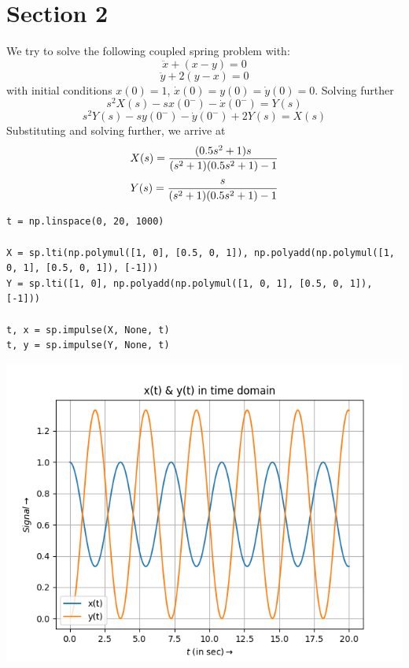 \documentclass[12pt, a4paper]{report}
\begin{document}
\section*{Section 2}
We try to solve the following coupled spring problem with:
\begin{equation*}
\ddot{x} + (x-y) = 0
\end{equation*}
\begin{equation*}
\ddot{y} + 2(y-x) = 0
\end{equation*}
with initial conditions $x(0) = 1$, $\dot{x}(0) = y(0) = \dot{y}(0) = 0$. Solving further 
\begin{equation*}
s^2X(s) -sx(0^-) - \dot{x}(0^-) = Y(s)
\end{equation*}
\begin{equation*}
s^2Y(s) -sy(0^-) - \dot{y}(0^-) + 2Y(s)= X(s)
\end{equation*}
Substituting and solving further, we arrive at
\begin{equation*}
X(s) = \frac{(0.5s^2+1)s}{(s^2 + 1)(0.5s^2 + 1) - 1}\\
\end{equation*}
\begin{equation*}
Y(s) = \frac{s}{(s^2 + 1)(0.5s^2 + 1) - 1}\\
\end{equation*}

\begin{verbatim}
t = np.linspace(0, 20, 1000)

X = sp.lti(np.polymul([1, 0], [0.5, 0, 1]), np.polyadd(np.polymul([1, 0, 1], [0.5, 0, 1]), [-1]))
Y = sp.lti([1, 0], np.polyadd(np.polymul([1, 0, 1], [0.5, 0, 1]), [-1]))

t, x = sp.impulse(X, None, t)
t, y = sp.impulse(Y, None, t)
\end{verbatim}

\begin{center}
	\includegraphics[scale=0.8]{Figure_3} 
	\label{fig:rawdata}
\end{center}
\end{document}
